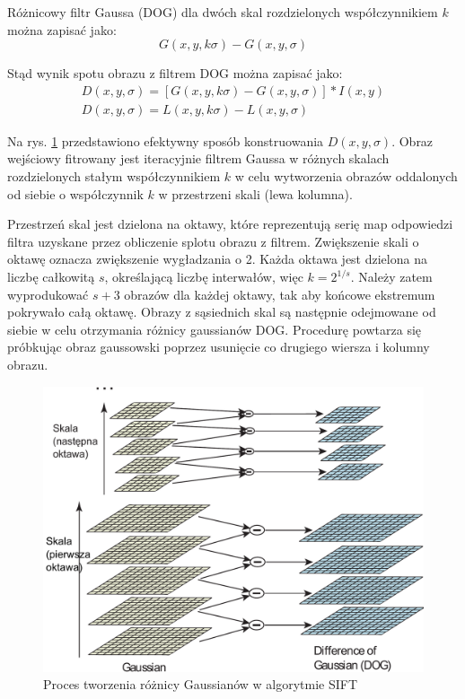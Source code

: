 Różnicowy filtr Gaussa (DOG) dla dwóch skal rozdzielonych współczynnikiem $k$ można zapisać jako:
\begin{equation} 
\label{sift_dog} 
G(x, y, k\sigma) - G(x, y, \sigma) 
\end{equation} 

Stąd wynik spotu obrazu z filtrem DOG można zapisać jako:
\begin{equation} 
\label{sift_splot} 
	\begin{gathered}
		D(x, y, \sigma) = [G(x, y, k\sigma) - G(x, y, \sigma)] \ast I(x, y) \\
		D(x, y, \sigma) = L(x, y, k\sigma) - L(x, y, \sigma)
	\end{gathered}
\end{equation}

Na rys. \ref{fig:sift-gaussian-to-dog} przedstawiono efektywny sposób konstruowania $D(x, y, \sigma)$. Obraz wejściowy fitrowany jest iteracyjnie filtrem Gaussa w różnych skalach rozdzielonych stałym współczynnikiem $k$ w celu wytworzenia obrazów oddalonych od siebie o współczynnik $k$ w przestrzeni skali (lewa kolumna).

Przestrzeń skal jest dzielona na oktawy, które reprezentują serię map odpowiedzi filtra uzyskane przez obliczenie splotu obrazu z filtrem. Zwiększenie skali o oktawę oznacza zwiększenie wygładzania o 2. Każda oktawa jest dzielona na liczbę całkowitą $s$, określającą liczbę interwałów, więc $k=2^{1/s}$. Należy zatem wyprodukować $s+3$ obrazów dla każdej oktawy, tak aby końcowe ekstremum pokrywało całą oktawę. Obrazy z sąsiednich skal są następnie odejmowane od siebie w celu otrzymania różnicy gaussianów DOG. Procedurę powtarza się próbkując obraz gaussowski poprzez usunięcie co drugiego wiersza i kolumny obrazu.\cite{LOWE04}

\begin{figure}[h]
	\centering
	\includegraphics[scale=0.4]{graphics/01_podstawy_teoretyczne/sift-gaussian-to-dog.pdf}
	\caption{Proces tworzenia różnicy Gaussianów w algorytmie SIFT \cite{LOWE04}}
	\label{fig:sift-gaussian-to-dog}
\end{figure}

